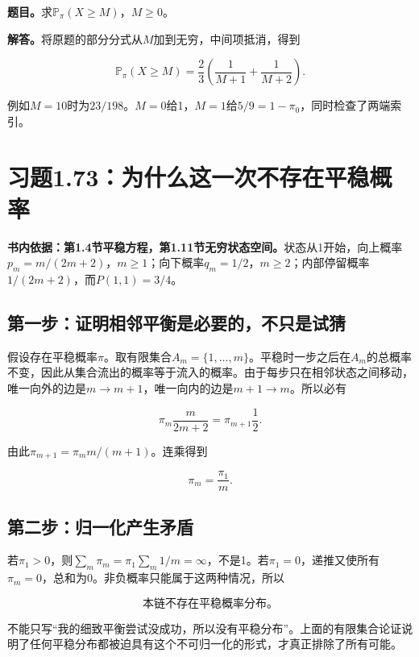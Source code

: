\documentclass[
  11pt,a4paper,UTF8,fontset=fandol]{ctexart}
\begin{document}
\textbf{题目。}求\(\mathbb P_\pi(X\ge M)\)，\(M\ge0\)。

\textbf{解答。}将原题的部分分式从\(M\)加到无穷，中间项抵消，得到

\[\boxed{\mathbb P_\pi(X\ge M)=\frac23\left(\frac1{M+1}+\frac1{M+2}\right).}\]

例如\(M=10\)时为\(23/198\)。\(M=0\)给1，\(M=1\)给\(5/9=1-\pi_0\)，同时检查了两端索引。

\section{习题1.73：为什么这一次不存在平稳概率}\label{ux4e60ux98981.73ux4e3aux4ec0ux4e48ux8fd9ux4e00ux6b21ux4e0dux5b58ux5728ux5e73ux7a33ux6982ux7387}

\textbf{书内依据：第1.4节平稳方程，第1.11节无穷状态空间。}状态从1开始，向上概率\(p_m=m/(2m+2)\)，\(m\ge1\)；向下概率\(q_m=1/2\)，\(m\ge2\)；内部停留概率\(1/(2m+2)\)，而\(P(1,1)=3/4\)。

\subsection{第一步：证明相邻平衡是必要的，不只是试猜}\label{ux7b2cux4e00ux6b65ux8bc1ux660eux76f8ux90bbux5e73ux8861ux662fux5fc5ux8981ux7684ux4e0dux53eaux662fux8bd5ux731c}

假设存在平稳概率\(\pi\)。取有限集合\(A_m=\{1,\ldots,m\}\)。平稳时一步之后在\(A_m\)的总概率不变，因此从集合流出的概率等于流入的概率。由于每步只在相邻状态之间移动，唯一向外的边是\(m\to m+1\)，唯一向内的边是\(m+1\to m\)。所以必有

\[\pi_m\frac{m}{2m+2}=\pi_{m+1}\frac12.\]

由此\(\pi_{m+1}=\pi_m m/(m+1)\)。连乘得到

\[\pi_m=\frac{\pi_1}{m}.\]

\subsection{第二步：归一化产生矛盾}\label{ux7b2cux4e8cux6b65ux5f52ux4e00ux5316ux4ea7ux751fux77dbux76fe}

若\(\pi_1>0\)，则\(\sum_m\pi_m=\pi_1\sum_m1/m=\infty\)，不是1。若\(\pi_1=0\)，递推又使所有\(\pi_m=0\)，总和为0。非负概率只能属于这两种情况，所以

\[\boxed{\text{本链不存在平稳概率分布。}}\]

不能只写``我的细致平衡尝试没成功，所以没有平稳分布''。上面的有限集合论证说明了任何平稳分布都被迫具有这个不可归一化的形式，才真正排除了所有可能。
\end{document}

